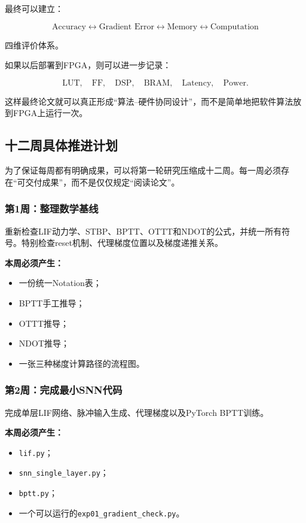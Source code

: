 \documentclass[journal,12pt,onecolumn]{IEEEtran}
\begin{document}
最终可以建立：

\[
\text{Accuracy}
\leftrightarrow
\text{Gradient Error}
\leftrightarrow
\text{Memory}
\leftrightarrow
\text{Computation}
\]

四维评价体系。

如果以后部署到FPGA，则可以进一步记录：

\[
\mathrm{LUT},
\quad
\mathrm{FF},
\quad
\mathrm{DSP},
\quad
\mathrm{BRAM},
\quad
\mathrm{Latency},
\quad
\mathrm{Power}.
\]

这样最终论文就可以真正形成“算法--硬件协同设计”，而不是简单地把软件算法放到FPGA上运行一次。


\subsection{十二周具体推进计划}

为了保证每周都有明确成果，可以将第一轮研究压缩成十二周。每一周必须存在“可交付成果”，而不是仅仅规定“阅读论文”。

\subsubsection{第1周：整理数学基线}

重新检查LIF动力学、STBP、BPTT、OTTT和NDOT的公式，并统一所有符号。特别检查reset机制、代理梯度位置以及梯度递推关系。

\textbf{本周必须产生：}

\begin{itemize}
    \item 一份统一Notation表；
    \item BPTT手工推导；
    \item OTTT推导；
    \item NDOT推导；
    \item 一张三种梯度计算路径的流程图。
\end{itemize}

\subsubsection{第2周：完成最小SNN代码}

完成单层LIF网络、脉冲输入生成、代理梯度以及PyTorch BPTT训练。

\textbf{本周必须产生：}

\begin{itemize}
    \item \texttt{lif.py}；
    \item \texttt{snn\_single\_layer.py}；
    \item \texttt{bptt.py}；
    \item 一个可以运行的\texttt{exp01\_gradient\_check.py}。
\end{itemize}
\end{document}
